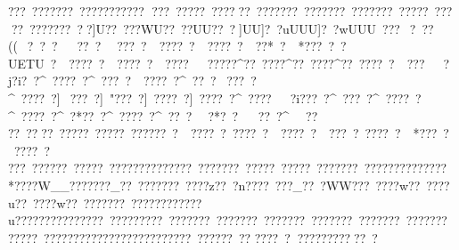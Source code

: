 {{{{{{{{{{{{{{{{{{{{{{{{{{{{{{{{{{{{{{{{{{{{{{{{{{{{{{{{{{{{{{{{{{{{{{{{{{{{{{{{{{{{{{{{{{{{{{{{{{{{{{{{{{{{{{{{{{{{{{{{{{{{{{{{{{{{{{{{{{{{{{{{{{{{{{{{{{{{{{{{{{{{{{{{{{{{{{{{{{{{{{{{{{{{{{{{{{{{{{{{{{{{{{{{{{{{{{{{{{{{{{{{{{{{{{{{{{{{{{{{{{{{{{{{{{{{{{{{{{{{{{{{{{{{{{{{{{{{{{{{{{{{{{{{{{{{{{{{{{{{{{{{{{{{{{{{{{{{{{{{{{{{{{{{{{{{{{{{{{{{{{{{{{{{{{{{{{{{{{{{{{{{{{{{{{{{{{{{{{{{{{{{{{{{{{{{{{{{{{{{{{{{{{{{{{{{{{{{{{{{{{{{{{{{{{{{{{{{{{{{{{{{{{{{{{{{{{{{{{{{{{{{{{{{{{{{{{{{{{{{{{{{{{{{{{{{{{{{{{{{{{{{{{{{{{{{{{{{{{{{{{{{{{{{{{{{{{{{{{{{{{{{{{{{{{{{{{{{{{{{{{{{{{{{{{{{{{{{{{{{{{{{{{{{{{{{{{{{{{{{{{{{{{{{{{{{{{{{{{{{{{{{{{{{{{{{{{{{{{{{{{{{{{{{{{{{{{{{{{{{{{{{{{{{{{{{{{{{{{{{{{{{{{{{{{{{{{{{{{{{{{{{{{{{{{{{{{{{{{{{{{{{{{{{{{{{{{{{{{{{{{{{{{{{{{{{{{{{{{{{{{{{{{{{{{{{{{{{{{{{{{{{{{{{{{{{{{{{{{{{{{{{{{{{{{{{{{{{{{{{{{{{{{{{{{{{{{{{{{{{{{{{{{{{{{{{{{{{{{{{{{{{{{{{{{{{{{{{{{{{{{{{{{{{{{{{{{{{{{{{{{{{{{{{{{{{{{{{{{{{{{{{{{{{{{{{{{{{{{{{{{{{{{{{{{{{{{{{{{{{{{{{{{{{{{{{{{{{{{{{{{{{{{{{{{{{{{{{{{{{{{{{{{{{{{{{{{{{{{{{{{{{{{{{{{{{{{{{{{{{{{{{{{{{{{{{{{{{{{{{{{{{{{{{{{{{{{{{{{{{{{{{{{{{{{{{{{{{{{{{{{{{{{{{{{{{{{{{{{{{{{{{{{{{{{{{{{{{{{{{{{{{{{{{{{{{{{{{{{{{{{{{{{{{{{{{{{{{{{{{{{{{{{{{{{{{{{{{{{{{{{{{{{{{{{{{{{{{{{{{{{{{{{{{{{{{{{{{{{{{{{{{{{{{{{{{{{{{{{{{{{{{{{{{{{{{{{{{{{{{{{{{{{{{{{{{{{{{{{{{{{{{{{{{{{{{{{{{{{{{{{{{{{{{{{{{{{{{{{{{{{{{{{{{{{{{{{{{{{{{{{{{{{{{{{{{{{{{{{{{{{{{{{{{{{{{{{{{{{{{{{{{{{{{{{{{{{{{{{{{{{{{{{{{{{{{{{{{{{{{{{{{{{{{{{{{{{{{{{{{{{{{{{{{{{{{{{{{{{{{{{{{{{{{{{{{{{{{{{{{{{{{{{{{{{{{{{{{{{{{{{{{{{{{{{{{{{{{{{{{{{{{{{{{{{{{{{{{{{{{{{{{{{{{{{{{{{{{{{{{{{{{{{{{{{{{{{{{{{{{{{{{{{{{{{{{{{{{{{{{{{{{{{{{{{{{{{{{{{{{{{{{{{{{{{{{{{{{{{{{{{{{{{{{{{{{{{{{{{{{{{{{{{{{{{{{{{{{{{{{{{{{{{{{{{{{{{{{{???~???????~???????????
 ???~?????~??????~???????~???????~???????~???}??~???}??~???????~??]U??~???WU??~??UU??~?]UU]?~?uUUU]?~?wUUU~???   ~?~??((~?~?    ~?~~??~?~~???~?~~????~?~~????~?~~ ??*~?~~*???~?~?UETU~?~~????~?~~????~?~~????~~~?????^??~????^??~????^??~????~?~~???~~~?j?i?~?^~????~?^~???~?~~????~?^~??~?}~ ???~?^~????~?]~???~?]~"???~?]~????~?]~????~?^~????~~~?i???~?^~???~?^~????~?^~????~?^~?*??~?^~????~?^~  ??~?~~?*?~?~~ ??~?^~    ~?}? 
??~?}? ??~?}? ???~?}? ???~?}?????~?~~????~?}~????~?~~????~?~~???~?}~????~?~~*???~?~~????~?}~ 
???~??????~?????~???????}???????~???????~?????~?????~???????~??????????????*????W__???????_??~???????~????z??~?n????~???_??~?WW???~????w??~????u??~????w??~???????~????????????u???????}????????~?????????~???????~???????~???????~???????~???????~???????~?????~?????????????????????????~? ?????~??
????~????????????~?   }}}}}}}}}}}}}}}}}}}}}}}}}}}}}}}}}}}}}}}}}}}}}}}}}}}}}}}}}}}}}}}}}}}}}}}}}}}}}}}}}}}}}}}}}}}}}}}}}}}}}}}}}}}}}}}}}}}}}}}}}}}}}}}}}}}}}}}}}}}}}}}}}}}}}}}}}}}}}}}}}}}}}}}}}}}}}}}}}}}}}}}}}}}}}}}}}}}}}}}}}}}}}}}}}}}}}}}}}}}}}}}}}}}}}}}}}}}}}}}}}}}}}}}}}}}}}}}}}}}}}}}}}}}}}}}}}}}}}}}}}}}}}}}}}}}}}}}}}}}}}}}}}}}}}}}}}}}}}}}}}}}}}}}}}}}}}}}}}}}}}}}}}}}}}}}}}}}}}}}}}}}}}}}}}}}}}}}}}}}}}}}}}}}}}}}}}}}}}}}}}}}}}}}}}}}}}}}}}}}}}}}}}}}}}}}}}}}}}}}}}}}}}}}}}}}}}}}}}}}}}}}}}}}}}}}}}}}}}}}}}}}}}}}}}}}}}}}}}}}}}}}}}}}}}}}}}}}}}}}}}}}}}}}}}}}}}}}}}}}}}}}}}}}}}}}}}}}}}}}}}}}}}}}}}}}}}}}}}}}}}}}}}}}}}}}}}}}}}}}}}}}}}}}}}}}}}}}}}}}}}}}}}}}}}}}}}}}}}}}}}}}}}}}}}}}}}}}}}}}}}}}}}}}}}}}}}}}}}}}}}}}}}}}}}}}}}}}}}}}}}}}}}}}}}}}}}}}}}}}}}}}}}}}}}}}}}}}}}}}}}}}}}}}}}}}}}}}}}}}}}}}}}}}}}}}}}}}}}}}}}}}}}}}}}}}}}}}}}}}}}}}}}}}}}}}}}}}}}}}}}}}}}}}}}}}}}}}}}}}}}}}}}}}}}}}}}}}}}}}}}}}}}}}}}}}}}}}}}}}}}}}}}}}}}}}}}}}}}}}}}}}}}}}}}}}}}}}}}}}}}}}}}}}}}}}}}}}}}}}}}}}}}}}}}}}}}}}}}}}}}}}}}}}}}}}}}}}}}}}}}}}}}}}}}}}}}}}}}}}}}}}}}}}}}}}}}}}}}}}}}}}}}}}}}}}}}}}}}}}}}}}}}}}}}}}}}}}}}}}}}}}}}}}}}}}}}}}}}}}}}}}}}}}}}}}}}}}}}}}}}}}}}}}}}}}}}}}}}}}}}}}}}}}}}}}}}}}}}}}}}}}}}}}}}}}}}}}}}}}}}}}}}}}}}}}}}}}}}}}}}}}}}}}}}}}}}}}}}}}}}}}}}}}}}}}}}}}}}}}}}}}}}}}}}}}}}}}}}}}}}}}}}}}}}}}}}}}}}}}}}}}}}}}}}}}}}}}}}}}}}}}}}}}}}}}}}}}}}}}}}}}}}}}}}}}}}}}}}}}}}}}}}}}}}}}}}}}}}}}}}}}}}}}}}}}}}}}}}}}}}}}}}}}}}}}}}}}}}}}}}}}}}}}}}}}}}}}}}}}}}}}}}}}}}}}}}}}}}}}}}}}}}}}}}}}}}}}}}}}}}}}}}}}}}}}}}}}}}}}}}}}}}}}}}}}}}}}}}}}}}}}}}}}}}}}}}}}}}}}}}}}}}}}}}}}}}}}}}}}}}}}}}}}}}}}}}}}}}}}}}}}}}}}}}}}}}}}}}}}}}}}}}}}}}}}}}}}}}}}}}}}}}}}}}}}}}}}}}}}}}}}}}}}}}}}}}}}}}}}}}}}}}}}}}}}}}}}}}}}}}}}}}}}}}}}}}}}}}}}}}}}}}}}}}}}}}}}}}}}}}}}}}}}}}}}}}}}}}}}}}}}}
